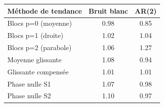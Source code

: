 \begin{tabular}{lcc}
\toprule
Méthode de tendance & Bruit blanc & AR(2) \\
\midrule
Blocs p=0 (moyenne) & 0.98 & 0.85 \\
Blocs p=1 (droite) & 1.02 & 1.04 \\
Blocs p=2 (parabole) & 1.06 & 1.27 \\
Moyenne glissante & 1.08 & 0.94 \\
Glissante compensée & 1.01 & 1.01 \\
Phase nulle S1 & 1.07 & 0.98 \\
Phase nulle S2 & 1.10 & 0.97 \\
\bottomrule
\end{tabular}
